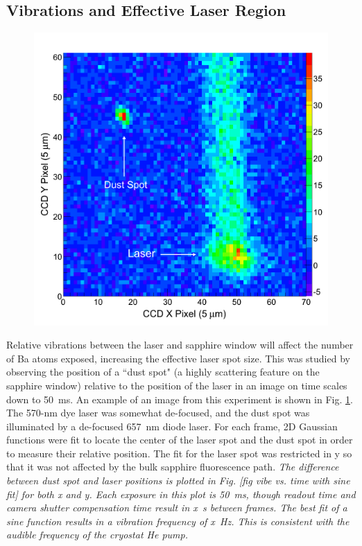 
\subsection{Vibrations and Effective Laser Region}

\begin{figure} %
        \centering
                \includegraphics[width=.6\textwidth]{figures/image_dustspot.png}
                \caption{}
\label{fig:dustspot}
\end{figure}

Relative vibrations between the laser and sapphire window will affect the number of Ba atoms exposed, increasing the effective laser spot size.  This was studied by observing the position of a ``dust spot" (a highly scattering feature on the sapphire window) relative to the position of the laser in an image on time scales down to 50~ms.  An example of an image from this experiment is shown in Fig. \ref{fig:dustspot}.  The 570-nm dye laser was somewhat de-focused, and the dust spot was illuminated by a de-focused 657~nm diode laser. For each frame, 2D Gaussian functions were fit to locate the center of the laser spot and the dust spot in order to measure their relative position.  The fit for the laser spot was restricted in y so that it was not affected by the bulk sapphire fluorescence path.  \emph{\color{gray}The difference between dust spot and laser positions is plotted in Fig. [fig vibe vs. time with sine fit] for both x and y.  Each exposure in this plot is 50~ms, though readout time and camera shutter compensation time result in x~s between frames.  The best fit of a sine function results in a vibration frequency of x~Hz.  This is consistent with the audible frequency of the cryostat He pump.}


